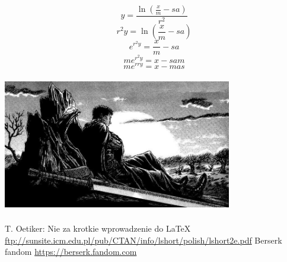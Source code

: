 \documentclass{article}
\begin{document}
\begin{equation}
y=\frac{\ln(\frac{x}{m}-sa)}{r^2}
\end{equation}
\begin{equation}
r^2y=\ln(\frac{x}{m}-sa)
\end{equation}
\begin{equation}
e^{r^2y}=\frac{x}{m}-sa
\end{equation}
\begin{equation}
me^{r^2y}=x-sam
\end{equation}
\begin{equation}
me^{rry}=x-mas
\end{equation}

\begin{center}
\includegraphics[width=100mm,height=60mm]{berserk.jpg}
\end{center}


\newpage
\begin{thebibliography}{9}
 T. Oetiker:
Nie za krotkie wprowadzenie do \LaTeX\newline
\url{ftp://sunsite.icm.edu.pl/pub/CTAN/info/lshort/polish/lshort2e.pdf}
 Berserk fandom
\url{https://berserk.fandom.com}
\end{thebibliography}
\end{document}
